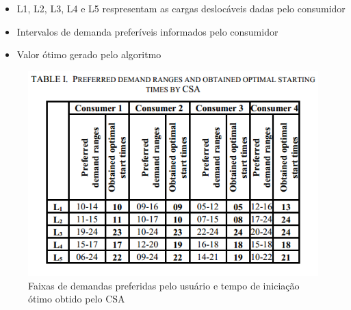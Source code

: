 \begin{frame}
  \begin{block}{}
    \begin{itemize}
      \item \alert{L1}, \alert{L2}, \alert{L3}, \alert{L4} e \alert{L5} respresentam as cargas deslocáveis dadas pelo consumidor
      \item Intervalos de demanda preferíveis informados pelo consumidor
      \item Valor ótimo gerado pelo algoritmo 
    \end{itemize}  
  \end{block}
  
  \begin{figure}[h]
  	\begin{center}
      \includegraphics [scale=0.45]{./Figures/result2}
      \caption {\footnotesize Faixas de demandas preferidas pelo usuário e tempo de iniciação ótimo obtido pelo CSA}
  	\end{center}
  \end{figure}
\end{frame}

